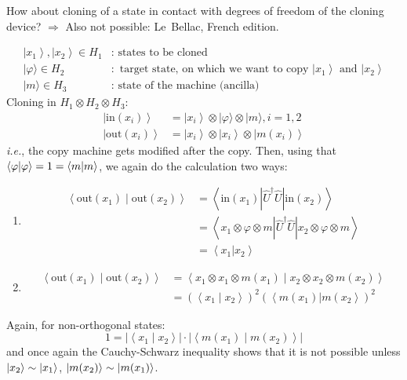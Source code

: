 \documentclass[12pt]{article}
\newcommand{\be}{\begin{equation}}
\newcommand{\ee}{\end{equation}}
\begin{document}
How about cloning of a state in contact with
degrees of freedom of the cloning device?
$\Rightarrow$ Also not possible: Le~Bellac, French edition.


\[
\begin{aligned}
\left|x_{1}\right\rangle,\left|x_{2}\right\rangle \in H_{1} 
&:\text { states to be cloned } \\ 
|\varphi\rangle \in H_{2}
&:\text { target state, on which we want to copy }\left|x_{1}\right\rangle \text { and }\left|x_{2}\right\rangle\\
|m\rangle \in H_3
&: \text { state of the machine (ancilla) }
\end{aligned}
\]
Cloning in $H_1 \otimes H_2 \otimes H_3$:
\[
\begin{aligned}
\left|\text{in}\left(x_{i}\right)\right\rangle
&=\left|x_{i}\right\rangle \otimes|\varphi\rangle \otimes|m\rangle, i=1,2\\
\left|\text{out}\left(x_{i}\right)\right\rangle
&=\left|x_{i}\right\rangle \otimes\left|x_{i}\right\rangle \otimes\left|m\left(x_{i}\right)\right\rangle
\end{aligned}
\]
\textit{i.e.}, the copy machine gets modified after the copy. Then,
using that $\bra{\varphi}\ket{\varphi} = 1 = \bra{m}\ket{m}$,
we again do the calculation two ways:
\begin{enumerate}
\item
\be
\begin{aligned}
\left\langle\text{out}\left(x_{1}\right) \mid \text{out}\left(x_{2}\right)\right\rangle
&=\left\langle\text{in}\left(x_{1}\right)
\left|\hat{U}^{\dagger}\hat{U}\right| 
\text{in}\left(x_{2}\right)\right\rangle \\ 
&=\left\langle x_{1} \otimes \varphi \otimes m\left|\hat{U}^{\dagger} \hat{U}\right| x_{2} \otimes \varphi \otimes m\right\rangle\\
&=\left\langle x_{1} | x_{2}\right\rangle
\end{aligned}
\ee
%
\item
\be
\begin{aligned}
\left\langle\text{out}\left(x_{1}\right) \mid \text{out}\left(x_{2}\right)\right\rangle 
&=\left\langle x_{1} \otimes x_{1} \otimes m\left(x_{1}\right) \mid x_{2} \otimes x_{2} \otimes m\left(x_{2}\right)\right\rangle \\ 
&=\left(\left\langle x_{1} \mid x_{2}\right\rangle\right)^{2}\left(\left\langle m\left(x_{1}\right)\right| m\left(x_{2}\right\rangle\right)^{2} \end{aligned}
\ee
\end{enumerate}
Again, for non-orthogonal states:
\[
1=\left|\left\langle x_{1} \mid x_{2}\right\rangle\right|\cdot\left|\left\langle m\left(x_{1}\right) \mid m\left(x_{2}\right)\right\rangle\right|
\]
and once again the Cauchy-Schwarz inequality shows that it is not possible unless
$\ket{x_2} \sim \ket{x_1}$, $\ket{m(x_2)} \sim \ket{m(x_1)}$.
\end{document}
